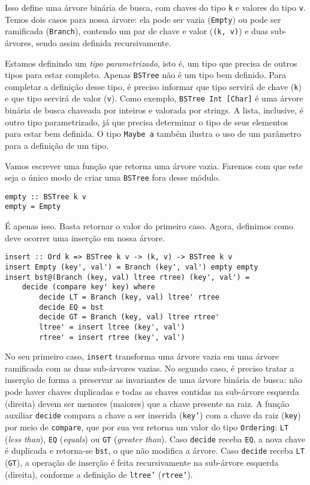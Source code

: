 \documentclass[a4paper]{article}
\begin{document}
Isso define uma árvore binária de busca, com chaves do tipo \texttt{k} e valores do tipo \texttt{v}.
Temos dois casos para nossa árvore: ela pode ser vazia (\texttt{Empty}) ou pode ser ramificada (\texttt{Branch}), contendo um par de chave e valor (\texttt{(k, v)}) e duas sub-árvores, sendo assim definida recursivamente.

Estamos definindo um \emph{tipo parametrizado}, isto é, um tipo que precisa de outros tipos para estar completo.
Apenas \texttt{BSTree} não é um tipo bem definido.
Para completar a definição desse tipo, é preciso informar que tipo servirá de chave (\texttt{k}) e que tipo servirá de valor (\texttt{v}).
Como exemplo, \texttt{BSTree Int [Char]} é uma árvore binária de busca chaveada por inteiros e valorada por strings.
A lista, inclusive, é outro tipo parametrizado, já que precisa determinar o tipo de seus elementos para estar bem definida.
O tipo \texttt{Maybe a} também ilustra o uso de um parâmetro para a definição de um tipo.

Vamos escrever uma função que retorna uma árvore vazia.
Faremos com que este seja o único modo de criar uma \texttt{BSTree} fora desse módulo.

\begin{verbatim}
empty :: BSTree k v
empty = Empty
\end{verbatim}

É apenas isso.
Basta retornar o valor do primeiro caso.
Agora, definimos como deve ocorrer uma inserção em nossa árvore.

\begin{verbatim}
insert :: Ord k => BSTree k v -> (k, v) -> BSTree k v
insert Empty (key', val') = Branch (key', val') empty empty
insert bst@(Branch (key, val) ltree rtree) (key', val') =
	decide (compare key' key) where
		decide LT = Branch (key, val) ltree' rtree
		decide EQ = bst
		decide GT = Branch (key, val) ltree rtree'
		ltree' = insert ltree (key', val')
		rtree' = insert rtree (key', val')
\end{verbatim}

No seu primeiro caso, \texttt{insert} transforma uma árvore vazia em uma árvore ramificada com as duas sub-árvores vazias.
No segundo caso, é preciso tratar a inserção de forma a preservar as invariantes de uma árvore binária de busca: não pode haver chaves duplicadas e todas as chaves contidas na sub-árvore esquerda (direita) devem ser menores (maiores) que a chave presente na raiz.
A função auxiliar \texttt{decide} compara a chave a ser inserida (\texttt{key'}) com a chave da raiz (\texttt{key}) por meio de \texttt{compare}, que por sua vez retorna um valor do tipo \texttt{Ordering}: \texttt{LT} (\emph{less than}), \texttt{EQ} (\emph{equals}) ou \texttt{GT} (\emph{greater than}).
Caso \texttt{decide} receba \texttt{EQ}, a nova chave é duplicada e retorna-se \texttt{bst}, o que não modifica a árvore.
Caso \texttt{decide} receba \texttt{LT} (\texttt{GT}), a operação de inserção é feita recursivamente na sub-árvore esquerda (direita), conforme a definição de \texttt{ltree'} (\texttt{rtree'}).
\end{document}

